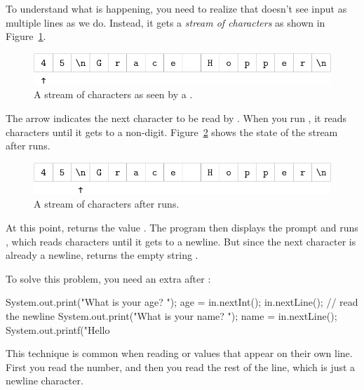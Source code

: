 To understand what is happening, you need to realize that  doesn't see input as multiple lines as we do.
Instead, it gets a {\em stream of characters} as shown in Figure~\ref{fig.hopper1}.

\begin{figure}[!ht]
\begin{center}
\includegraphics{figs/hopper1.pdf}
\caption{A stream of characters as seen by a .}
\label{fig.hopper1}
\end{center}
\end{figure}

The arrow indicates the next character to be read by .
When you run , it reads characters until it gets to a non-digit.
Figure~\ref{fig.hopper2} shows the state of the stream after  runs.

\begin{figure}[!ht]
\begin{center}
\includegraphics{figs/hopper2.pdf}
\caption{A stream of characters after  runs.}
\label{fig.hopper2}
\end{center}
\end{figure}

At this point,  returns the value .
The program then displays the prompt  and runs , which reads characters until it gets to a newline.
But since the next character is already a newline,  returns the empty string .

To solve this problem, you need an extra  after :

\begin{code}
System.out.print("What is your age? ");
age = in.nextInt();
in.nextLine();  // read the newline
System.out.print("What is your name? ");
name = in.nextLine();
System.out.printf("Hello %
\end{code}

This technique is common when reading  or  values that appear on their own line.
First you read the number, and then you read the rest of the line, which is just a newline character.


